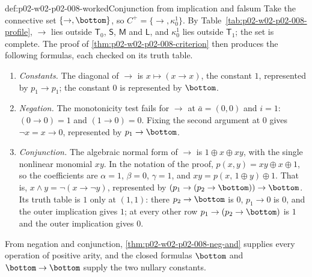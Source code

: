 \begin{hbexample}{def:p02-w02-p02-008-worked}{Conjunction from implication and falsum}
Take the connective set \(\{\to,\bottom\}\), so \(C^+=\{\to,\kappa^1_0\}\).
By Table~\ref{tab:p02-w02-p02-008-profile}, \(\to\) lies outside
\(\mathsf T_0\), \(\mathsf S\), \(\mathsf M\) and \(\mathsf L\), and
\(\kappa^1_0\) lies outside \(\mathsf T_1\); the set is complete.  The proof
of \cref{thm:p02-w02-p02-008-criterion} then produces the following
formulas, each checked on its truth table.
\begin{enumerate}
\item \emph{Constants.}  The diagonal of \(\to\) is
  \(x\mapsto(x\to x)\), the constant \(1\), represented by
  \(p_1\to p_1\); the constant \(0\) is represented by \(\bottom\).
\item \emph{Negation.}  The monotonicity test fails for \(\to\) at
  \(\bar a=(0,0)\) and \(i=1\): \((0\to0)=1\) and \((1\to0)=0\).  Fixing
  the second argument at \(0\) gives \(\neg x=x\to0\), represented by
  \(p_1\to\bottom\).
\item \emph{Conjunction.}  The algebraic normal form of \(\to\) is
  \(1\oplus x\oplus xy\), with the single nonlinear monomial \(xy\).  In the
  notation of the proof, \(p(x,y)=xy\oplus x\oplus1\), so the coefficients
  are \(\alpha=1\), \(\beta=0\), \(\gamma=1\), and
  \(xy=p(x,\,1\oplus y)\oplus1\).  That is,
  \(x\land y=\neg(x\to\neg y)\), represented by
  \((p_1\to(p_2\to\bottom))\to\bottom\).  Its truth table is \(1\) only at
  \((1,1)\): there \(p_2\to\bottom\) is \(0\), \(p_1\to0\) is \(0\), and the
  outer implication gives \(1\); at every other row \(p_1\to(p_2\to\bottom)\)
  is \(1\) and the outer implication gives \(0\).
\end{enumerate}
From negation and conjunction, \cref{thm:p02-w02-p02-008-neg-and} supplies
every operation of positive arity, and the closed formulas \(\bottom\) and
\(\bottom\to\bottom\) supply the two nullary constants.
\end{hbexample}

